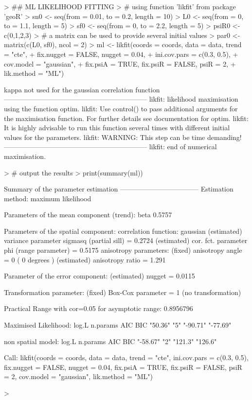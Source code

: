\documentclass[a4paper]{article}
\begin{document}
\begin{Schunk}
\begin{Sinput}
> ## ML LIKELIHOOD FITTING 
> # using function 'likfit' from package 'geoR'
> sn0 <- seq(from = 0.01, to = 0.2, length = 10)
> L0 <- seq(from = 0, to = 1.1, length = 5) 
> sf0 <- seq(from = 0, to = 2.2, length = 5)
> psiR0 <- c(0,1,2,3)
> # a matrix can be used to provide several initial values
> par0 <- matrix(c(L0, sf0), ncol = 2)
> ml <- likfit(coords = coords, data = data, trend = "cte", 
+ 	 	fix.nugget = FALSE, nugget = 0.04,
+ 	 	ini.cov.pars = c(0.3, 0.5),
+ 	 	cov.model = "gaussian", 
+        	fix.psiA = TRUE, fix.psiR = FALSE, psiR = 2,
+ 	 	lik.method = "ML")
\end{Sinput}
\begin{Soutput}
kappa not used for the gaussian correlation function
---------------------------------------------------------------
likfit: likelihood maximisation using the function optim.
likfit: Use control() to pass additional
         arguments for the maximisation function.
        For further details see documentation for optim.
likfit: It is highly advisable to run this function several
        times with different initial values for the parameters.
likfit: WARNING: This step can be time demanding!
---------------------------------------------------------------
likfit: end of numerical maximisation.
\end{Soutput}
\begin{Sinput}
> # output the results
> print(summary(ml))
\end{Sinput}
\begin{Soutput}
Summary of the parameter estimation
-----------------------------------
Estimation method: maximum likelihood 

Parameters of the mean component (trend):
  beta 
0.5757 

Parameters of the spatial component:
   correlation function: gaussian
      (estimated) variance parameter sigmasq (partial sill) =  0.2724
      (estimated) cor. fct. parameter phi (range parameter)  =  0.5175
   anisotropy parameters:
      (fixed) anisotropy angle = 0  ( 0 degrees )
      (estimated) anisotropy ratio = 1.291

Parameter of the error component:
      (estimated) nugget =  0.0115

Transformation parameter:
      (fixed) Box-Cox parameter = 1 (no transformation)

Practical Range with cor=0.05 for asymptotic range: 0.8956796

Maximised Likelihood:
   log.L n.params      AIC      BIC 
 "50.36"      "5" "-90.71" "-77.69" 

non spatial model:
   log.L n.params      AIC      BIC 
"-58.67"      "2"  "121.3"  "126.6" 

Call:
likfit(coords = coords, data = data, trend = "cte", ini.cov.pars = c(0.3, 
    0.5), fix.nugget = FALSE, nugget = 0.04, fix.psiA = TRUE, 
    fix.psiR = FALSE, psiR = 2, cov.model = "gaussian", lik.method = "ML")
\end{Soutput}
\begin{Sinput}
> 
\end{Sinput}
\end{Schunk}
\end{document}
